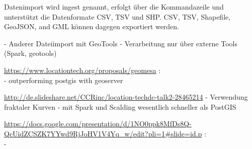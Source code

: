 Datenimport wird ingest genannt, erfolgt über die Kommandazeile und unterstützt die Datenformate CSV, TSV und SHP.
CSV, TSV, Shapefile, GeoJSON, and GML können dagegen exportiert werden.


- Anderer Dateiimport mit GeoTools
- Verarbeitung nur über externe Tools (Spark, geotools)


\url{https://www.locationtech.org/proposals/geomesa} :\\
- outperforming postgis with geoserver


\url{http://de.slideshare.net/CCRinc/location-techdc-talk2-28465214}
- Verwendung fraktaler Kurven
- mit Spark und Scalding wesentlich schneller als PostGIS


\url{https://docs.google.com/presentation/d/1NO0ppk8MfDs8Q-QcUidZCSZK7YYwd9RjJoHV1V4Yq_w/edit?pli=1#slide=id.p} :\\
- 





